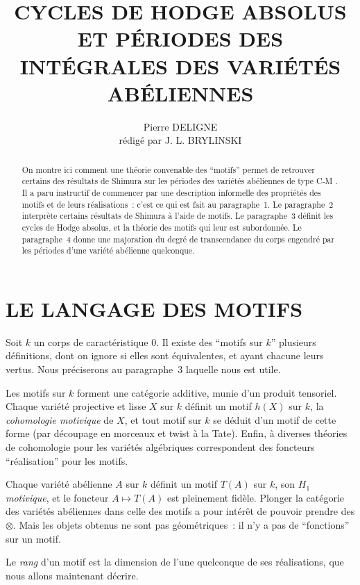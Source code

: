 \documentclass[12pt,a4paper]{article}
\title{\textbf{CYCLES DE HODGE ABSOLUS ET PÉRIODES DES\\INTÉGRALES DES VARIÉTÉS ABÉLIENNES}}
\author{Pierre DELIGNE\\\small rédigé par J. L. BRYLINSKI}
\date{}
\theoremstyle{plain}
\theoremstyle{definition}
\theoremstyle{remark}
\begin{document}
\maketitle
\thispagestyle{empty}

\begin{abstract}
\noindent
On montre ici comment une théorie convenable des ``motifs'' permet de retrouver certains des résultats de Shimura sur les périodes des variétés abéliennes de type C-M \cite{Shimura2}. Il a paru instructif de commencer par une description informelle des propriétés des motifs et de leurs réalisations~: c'est ce qui est fait au paragraphe~1. Le paragraphe~2 interprète certains résultats de Shimura à l'aide de motifs. Le paragraphe~3 définit les cycles de Hodge absolus, et la théorie des motifs qui leur est subordonnée. Le paragraphe~4 donne une majoration du degré de transcendance du corps engendré par les périodes d'une variété abélienne quelconque.
\end{abstract}

\section{LE LANGAGE DES MOTIFS}

Soit $k$ un corps de caractéristique $0$. Il existe des ``motifs sur $k$'' plusieurs définitions, dont on ignore si elles sont équivalentes, et ayant chacune leurs vertus. Nous préciserons au paragraphe~3 laquelle nous est utile.

Les motifs sur $k$ forment une catégorie additive, munie d'un produit tensoriel. Chaque variété projective et lisse $X$ sur $k$ définit un motif $h(X)$ sur $k$, la \emph{cohomologie motivique} de $X$, et tout motif sur $k$ se déduit d'un motif de cette forme (par découpage en morceaux et twist à la Tate). Enfin, à diverses théories de cohomologie pour les variétés algébriques correspondent des foncteurs ``réalisation'' pour les motifs.

Chaque variété abélienne $A$ sur $k$ définit un motif $T(A)$ sur $k$, son $H_1$ \emph{motivique}, et le foncteur $A \mapsto T(A)$ est pleinement fidèle. Plonger la catégorie des variétés abéliennes dans celle des motifs a pour intérêt de pouvoir prendre des $\otimes$. Mais les objets obtenus ne sont pas géométriques~: il n'y a pas de ``fonctions'' sur un motif.

Le \emph{rang} d'un motif est la dimension de l'une quelconque de ses réalisations, que nous allons maintenant décrire.
\end{document}
